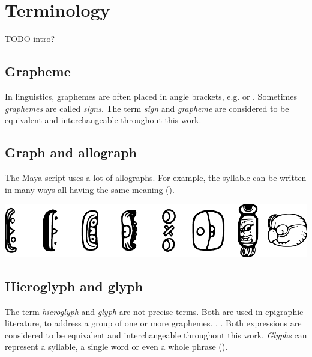 \documentclass[../main.tex]{subfiles}
\begin{document}
\chapter{Terminology}
TODO intro?
\section{Grapheme}
In linguistics, graphemes are often placed in angle brackets, e.g.  or .
Sometimes \emph{graphemes} are called \emph{signs}.
The term \emph{sign} and \emph{grapheme} are considered to be equivalent and 
interchangeable throughout this work.

\section{Graph and allograph}
The Maya script uses a lot of allographs.
For example, the syllable  can be written in many ways all having the same meaning 
().
\begin{center}
    \includegraphics[width=\textwidth,keepaspectratio]{img/grapheme-u-allographs}
    \label{fig:terminology-grapheme-u-allographs}
\end{center}

\section{Hieroglyph and glyph}
The term \emph{hieroglyph} and \emph{glyph} are not precise terms.
Both are used in epigraphic literature, to address a group of one or more graphemes.
.
. 
Both expressions are considered to be equivalent and interchangeable throughout this work.
\emph{Glyphs} can represent a syllable, a single word or even a whole phrase 
(\cite[23]{macrilooper2003}).
\end{document}
